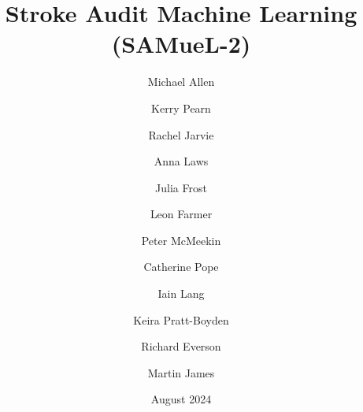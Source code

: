 \title{Stroke Audit Machine Learning (SAMueL-2)}
\date{August 2024}


\renewcommand{\thefootnote}{\fnsymbol{footnote}}

\author[*1,2]{Michael Allen}
\author[1,2]{Kerry Pearn}
\author[1]{Rachel Jarvie}
\author[1]{Anna Laws}
\author[1]{Julia Frost}
\author[1]{Leon Farmer}
\author[3]{Peter McMeekin}
\author[4]{Catherine Pope}
\author[1]{Iain Lang}
\author[1]{Keira Pratt-Boyden}
\author[1]{Richard Everson}
\author[1,5]{Martin James}

